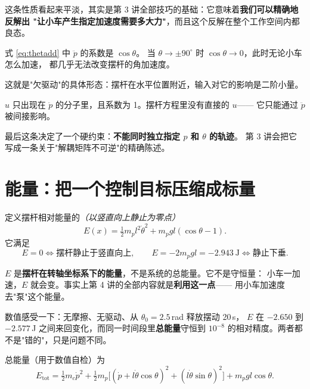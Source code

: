 这条性质看起来平淡，其实是第 3 讲全部技巧的基础：它意味着\textbf{我们可以精确地反解出
"让小车产生指定加速度需要多大力"}，而且这个反解在整个工作空间内都良态。

\begin{proposition}[摆杆通道会失去权限]
式 \eqref{eq:thetadd} 中 $\ddot p$ 的系数是 $\cos\theta$。
当 $\theta\to\pm90^\circ$ 时 $\cos\theta\to 0$，此时无论小车怎么加速，
都几乎无法改变摆杆的角加速度。
\end{proposition}

这就是"欠驱动"的具体形态：摆杆在水平位置附近，输入对它的影响是二阶小量。

\begin{proposition}[输入只有一个]
$u$ 只出现在 $\ddot p$ 的分子里，且系数为 1。摆杆方程里没有直接的 $u$——
它只能通过 $\ddot p$ 被间接影响。
\end{proposition}

最后这条决定了一个硬约束：\textbf{不能同时独立指定 $p$ 和 $\theta$ 的轨迹}。
第 3 讲会把它写成一条关于"解耦矩阵不可逆"的精确陈述。

\section{能量：把一个控制目标压缩成标量}

定义摆杆相对能量的\emph{（以竖直向上静止为零点）}
\begin{equation}
  E(x) = \tfrac12 m_p l^2\dot\theta^2 + m_p g l(\cos\theta-1).
  \label{eq:energy}
\end{equation}
它满足
\begin{equation}
  E = 0 \iff \text{摆杆静止于竖直向上},\qquad
  E = -2m_p g l = -2.943\ \text{J} \iff \text{静止下垂}.
\end{equation}

\begin{remark}
$E$ 是\textbf{摆杆在转轴坐标系下的能量}，不是系统的总能量。它不是守恒量：
小车一加速，$E$ 就会变。事实上第 4 讲的全部内容就是\textbf{利用这一点}——
用小车加速度去"泵"这个能量。

数值感受一下：无摩擦、无驱动、从 $\theta_0=2.5$\,rad 释放摆动 20\,s，
$E$ 在 $-2.650$ 到 $-2.577$\,J 之间来回变化，而同一时间段里\textbf{总能量}守恒到
$10^{-8}$ 的相对精度。两者都不是"错的"，只是问题不同。
\end{remark}

总能量（用于数值自检）为
\begin{equation}
  E_{\text{tot}} = \tfrac12 m_c \dot p^2
  + \tfrac12 m_p\big[(\dot p + l\dot\theta\cos\theta)^2
   + (l\dot\theta\sin\theta)^2\big]
  + m_p g l\cos\theta .
  \label{eq:etot}
\end{equation}


